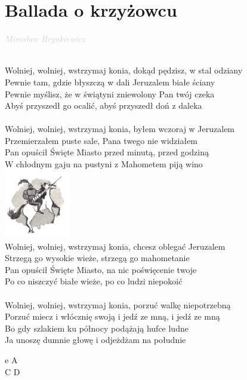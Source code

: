 \documentclass[a5paper, 10pt]{book}
\begin{document}
\section{Ballada o krzyżowcu}\textcolor{lightgray}{\textit{Mirosław Hrynkiewicz}}\\~\\
\begin{minipage}[t]{0.85\textwidth}
Wolniej, wolniej, wstrzymaj konia, dokąd pędzisz, w stal odziany\\
Pewnie tam, gdzie błyszczą w dali Jeruzalem białe ściany\\
Pewnie myślisz, że w świątyni zniewolony Pan twój czeka\\
Abyś przyszedł go ocalić, abyś przyszedł doń z daleka\\
\\
Wolniej, wolniej, wstrzymaj konia, byłem wczoraj w Jeruzalem\\
Przemierzałem puste sale, Pana twego nie widziałem\\
Pan opuścił Święte Miasto przed minutą, przed godziną\\
W chłodnym gaju na pustyni z Mahometem piją wino\\
\hspace*{10cm}\includegraphics[height=3cm]{images/ballada_o_krzyzowcu.png}\vspace*{-3cm}\\

Wolniej, wolniej, wstrzymaj konia, chcesz oblegać Jeruzalem\\
Strzegą go wysokie wieże, strzegą go mahometanie\\
Pan opuścił Święte Miasto, na nic poświęcenie twoje\\
Po co niszczyć białe wieże, po co ludzi niepokoić\\
\\
Wolniej, wolniej, wstrzymaj konia, porzuć walkę niepotrzebną\\
Porzuć miecz i włócznię swoją i jedź ze mną, i jedź ze mną\\
Bo gdy szlakiem ku północy podążają hufce ludne\\
Ja unoszę dumnie głowę i odjeżdżam na południe\\
\end{minipage}
\begin{minipage}[t]{0.2\textwidth}
e A\\C D\\
\end{minipage}
\end{document}
